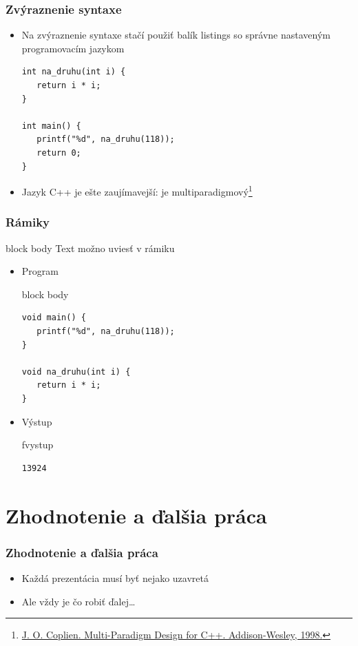 \documentclass{beamer}
\newcommand{\footcite}[1]{\footnote{\tiny #1}}
\newenvironment{program}{\begin{beamercolorbox}[rounded=true,shadow=true]{block body}\vspace{-4mm}}{\vspace{-2mm}\end{beamercolorbox}}
\newenvironment{vystup}{\begin{beamercolorbox}[rounded=true,shadow=true]{fvystup}}{\end{beamercolorbox}}
\newenvironment{poznamka}{\begin{beamercolorbox}[rounded=true,shadow=false]{block body}}{\end{beamercolorbox}}
\begin{document}
\begin{frame}[fragile=singleslide]\frametitle{Zvýraznenie syntaxe}
\begin{itemize}
\item Na zvýraznenie syntaxe stačí použiť balík listings so správne nastaveným programovacím jazykom
\begin{lstlisting}
int na_druhu(int i) {
   return i * i;
}

int main() {
   printf("%d", na_druhu(118));
   return 0;
}
\end{lstlisting}

\item Jazyk C++ je ešte zaujímavejší: je multiparadigmový\footcite{\url{J. O. Coplien. Multi-Paradigm Design for C++. Addison-Wesley, 1998.}}
\end{itemize}
\end{frame}


\begin{frame}[fragile=singleslide]\frametitle{Rámiky}
\begin{poznamka}
Text možno uviesť v rámiku
\end{poznamka}

\begin{itemize}
\item Program

\begin{program}
\begin{lstlisting}
void main() {
   printf("%d", na_druhu(118));
}

void na_druhu(int i) {
   return i * i;
}
\end{lstlisting}
\end{program}

\item Výstup
\begin{vystup}
\begin{lstlisting}
13924
\end{lstlisting}
\end{vystup}

\end{itemize}
\end{frame}



\section*{Zhodnotenie a ďalšia práca}

\begin{frame}[fragile=singleslide]\frametitle{Zhodnotenie a ďalšia práca}
\begin{itemize}
\item Každá prezentácia musí byť nejako uzavretá
\item Ale vždy je čo robiť ďalej\ldots{}
\end{itemize}
\end{frame}
\end{document}
